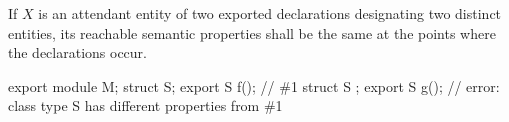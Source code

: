 \begin{std.txt}
  \alinea
  If $X$ is an attendant entity of two exported declarations
  designating two distinct entities, its reachable semantic properties shall
  be the same at the points where the declarations occur.
  \begin{example}
    \begin{codeblock}
      export module M;
      struct S;
      export S f();     // \#1
      struct S { };
      export S g();     // error: class type S has different properties from \#1
    \end{codeblock}
  \end{example}
  
\end{std.txt}

